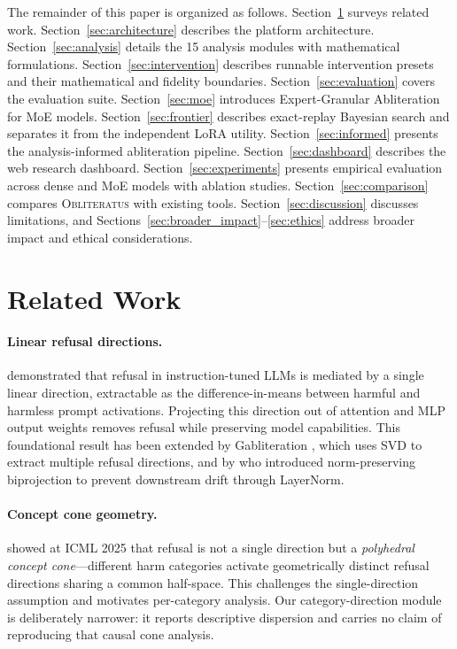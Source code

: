 \documentclass[11pt]{article}
\begin{document}
The remainder of this paper is organized as follows.
Section~\ref{sec:related} surveys related work.
Section~\ref{sec:architecture} describes the platform architecture.
Section~\ref{sec:analysis} details the 15 analysis modules with mathematical formulations.
Section~\ref{sec:intervention} describes runnable intervention presets and their mathematical and fidelity boundaries.
Section~\ref{sec:evaluation} covers the evaluation suite.
Section~\ref{sec:moe} introduces Expert-Granular Abliteration for MoE models.
Section~\ref{sec:frontier} describes exact-replay Bayesian search and separates it from the independent LoRA utility.
Section~\ref{sec:informed} presents the analysis-informed abliteration pipeline.
Section~\ref{sec:dashboard} describes the web research dashboard.
Section~\ref{sec:experiments} presents empirical evaluation across dense and MoE models with ablation studies.
Section~\ref{sec:comparison} compares \textsc{Obliteratus} with existing tools.
Section~\ref{sec:discussion} discusses limitations, and Sections~\ref{sec:broader_impact}--\ref{sec:ethics} address broader impact and ethical considerations.

\section{Related Work}
\label{sec:related}

\paragraph{Linear refusal directions.}
\citet{arditi2024refusal} demonstrated that refusal in instruction-tuned LLMs is mediated by a single linear direction, extractable as the difference-in-means between harmful and harmless prompt activations. Projecting this direction out of attention and MLP output weights removes refusal while preserving model capabilities. This foundational result has been extended by Gabliteration \citep{gabliteration2024}, which uses SVD to extract multiple refusal directions, and by \citet{grimjim2025} who introduced norm-preserving biprojection to prevent downstream drift through LayerNorm.

\paragraph{Concept cone geometry.}
\citet{wollschlager2025geometry} showed at ICML 2025 that refusal is not a single direction but a \emph{polyhedral concept cone}---different harm categories activate geometrically distinct refusal directions sharing a common half-space. This challenges the single-direction assumption and motivates per-category analysis.
Our category-direction module is deliberately narrower: it reports descriptive dispersion and carries no claim of reproducing that causal cone analysis.
\end{document}
